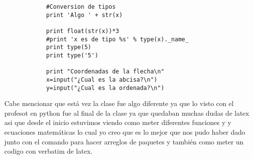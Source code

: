 \documentclass[letterpaper, 12pt, oneside]{article}
\begin{document}
\begin{enumerate}
\begin{enumerate}
\begin{verbatim}
			#Conversion de tipos
			print 'Algo ' + str(x)
			
			print float(str(x))*3
			#print 'x es de tipo %s' % type(x)._name_
			print type(5)
			print type('5')
			
			print "Coordenadas de la flecha\n"
			x=input("¿Cual es la abcisa?\n")
			y=input("¿Cual es la ordenada?\n")
			\end{verbatim}
			\newpage
			
			
			
			Cabe mencionar que está vez la clase fue algo diferente ya que lo visto con el profesot en python fue al final de la clase ya que quedaban muchas dudas de latex asi que desde el inicio estuvimos viendo como meter diferentes funciones y y ecuaciones matemáticas lo cual yo creo que es lo mejor que nos pudo haber dado junto con el comando para hacer arreglos de paquetes y también como meter un  codigo con verbatim de latex.
		\end{enumerate}
	\end{enumerate}
\end{document}
